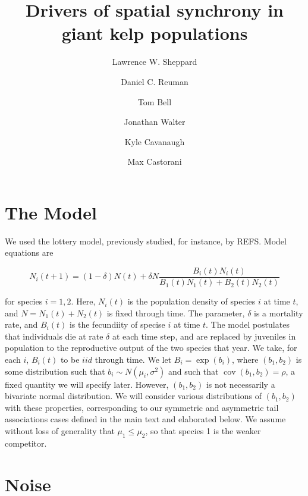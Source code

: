 \documentclass[letterpaper,11pt]{article}
\title{Drivers of spatial synchrony in giant kelp populations}
\date{}
\author{Lawrence W. Sheppard}
\author{Daniel C. Reuman}
\author{Tom Bell}
\author{Jonathan Walter}
\author{Kyle Cavanaugh}
\author{Max Castorani}
\DeclareMathOperator{\CovX}{cov}
\begin{document}



\maketitle


\section{The Model}

We used the lottery model, previously studied, for instance, by REFS. Model equations are

\begin{equation}
N_i(t+1)=(1-\delta)N(t)+\delta N \frac{B_i(t)N_i(t)}{B_1(t)N_1(t)+B_2(t)N_2(t)}  \label{model_eq}
\end{equation}

\noindent for species $i=1,2$. 
Here, $N_i(t)$ is the population density of species $i$ at time $t$, and $N = N_1(t)+N_2(t)$ is fixed through time. 
The parameter, $\delta$ is a mortality rate, and $B_i(t)$ is the fecundiity of specise $i$ at time $t$. 
The model postulates that individuals die at rate $\delta$ at each time step, and are replaced by juveniles in population to the reproductive output of the two species that year.
We take, for each $i$, $B_i(t)$ to be $iid$ through time. 
We let $B_i = \exp(b_i)$, where $\left(b_1, b_2\right)$ is some distribution such that $b_i \sim N\left(\mu_i, \sigma^2\right)$ and such that $\CovX(b_1, b_2) = \rho$, a fixed quantity we will specify later.
However, $\left(b_1, b_2\right)$ is not necessarily a bivariate normal distribution.
We will consider various distributions of $\left(b_1, b_2\right)$ with these properties, corresponding to our symmetric and asymmetric tail associations cases defined in the main text and elaborated below.
We assume without loss of generality that $\mu_1 \leq \mu_2$, so that species 1 is the weaker competitor. 

\section{Noise} \label{sect:noise}
\end{document}
